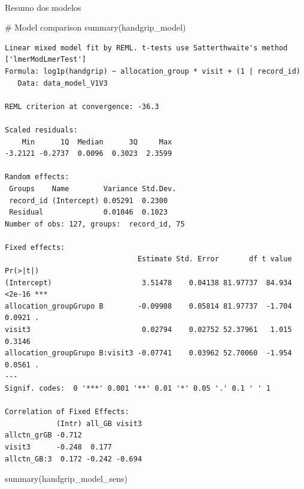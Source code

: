 \documentclass[
  12pt,
]{article}
\makeatletter
\let\oldparagraph\paragraph
\renewcommand{\paragraph}{
    \@ifstar
      \xxxParagraphStar
      \xxxParagraphNoStar
  }
\newcommand{\xxxParagraphStar}[1]{\oldparagraph*{#1}\mbox{}}
\newcommand{\xxxParagraphNoStar}[1]{\oldparagraph{#1}\mbox{}}
\newenvironment{Shaded}{\begin{snugshade}}{\end{snugshade}}
\newcommand{\CommentTok}[1]{\textcolor[rgb]{0.37,0.37,0.37}{#1}}
\newcommand{\FunctionTok}[1]{\textcolor[rgb]{0.28,0.35,0.67}{#1}}
\newcommand{\NormalTok}[1]{\textcolor[rgb]{0.00,0.23,0.31}{#1}}
\makeatother
\begin{document}
\paragraph{Resumo dos modelos}\label{resumo-dos-modelos-20}

\begin{Shaded}
\begin{Highlighting}[]
\CommentTok{\# Model comparison}
\FunctionTok{summary}\NormalTok{(handgrip\_model)}
\end{Highlighting}
\end{Shaded}

\begin{verbatim}
Linear mixed model fit by REML. t-tests use Satterthwaite's method ['lmerModLmerTest']
Formula: log1p(handgrip) ~ allocation_group * visit + (1 | record_id)
   Data: data_model_V1V3

REML criterion at convergence: -36.3

Scaled residuals: 
    Min      1Q  Median      3Q     Max 
-3.2121 -0.2737  0.0096  0.3023  2.3599 

Random effects:
 Groups    Name        Variance Std.Dev.
 record_id (Intercept) 0.05291  0.2300  
 Residual              0.01046  0.1023  
Number of obs: 127, groups:  record_id, 75

Fixed effects:
                               Estimate Std. Error       df t value Pr(>|t|)    
(Intercept)                     3.51478    0.04138 81.97737  84.934   <2e-16 ***
allocation_groupGrupo B        -0.09908    0.05814 81.97737  -1.704   0.0921 .  
visit3                          0.02794    0.02752 52.37961   1.015   0.3146    
allocation_groupGrupo B:visit3 -0.07741    0.03962 52.70060  -1.954   0.0561 .  
---
Signif. codes:  0 '***' 0.001 '**' 0.01 '*' 0.05 '.' 0.1 ' ' 1

Correlation of Fixed Effects:
            (Intr) all_GB visit3
allctn_grGB -0.712              
visit3      -0.248  0.177       
allctn_GB:3  0.172 -0.242 -0.694
\end{verbatim}

\begin{Shaded}
\begin{Highlighting}[]
\FunctionTok{summary}\NormalTok{(handgrip\_model\_sens)}
\end{Highlighting}
\end{Shaded}
\end{document}
